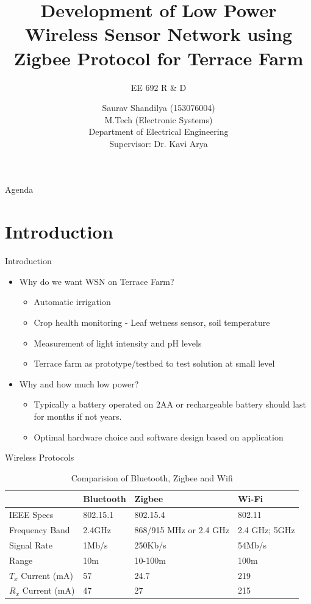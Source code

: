 \documentclass[t]{beamer} %
\title{Development of Low Power Wireless Sensor Network using Zigbee Protocol for Terrace Farm}
\subtitle
{	EE 692 R \& D
}
\author
{	
	Saurav Shandilya (153076004) \\
	M.Tech (Electronic Systems)\\
	Department of Electrical Engineering \\
	Supervisor: Dr. Kavi Arya
}
\date{} %
\begin{document}
\maketitle
\begin{frame}{Agenda}
\tableofcontents
\end{frame}

\section{Introduction}
\begin{frame}{Introduction}
\begin{itemize}
\item \large{Why do we want WSN on Terrace Farm? }
	\begin{itemize}
	\item Automatic irrigation
    \item Crop health monitoring - Leaf wetness sensor, soil temperature
    \item Measurement of light intensity and pH levels
    \item Terrace farm as prototype/testbed to test solution at small level \\[0.5cm]
	\end{itemize}	
\item \large{Why and how much low power?}
	\begin{itemize}
	\item Typically a battery operated on 2AA or rechargeable battery should last for months if not years.
    \item Optimal hardware choice and software design based on application
	\end{itemize}
	
\end{itemize}
\end{frame}

\begin{frame}{Wireless Protocols}
\begin{table}[!h]
	\caption{Comparision of Bluetooth, Zigbee and Wifi }
	\label{Effect of data sampling frequency on Disaggregration}
	\centering
	\begin{tabular}{|L|L|L|L|}
		\hline
		& Bluetooth & Zigbee & Wi-Fi \\
        \hline
        IEEE Specs & 802.15.1 & 802.15.4 & 802.11 \\
        \hline
        Frequency Band & 2.4GHz & 868/915 MHz or 2.4 GHz  & 2.4 GHz; 5GHz\\        
        \hline
        Signal Rate & 1Mb/s & 250Kb/s & 54Mb/s \\
        \hline
        Range & 10m & 10-100m & 100m \\
        \hline
        $T_x$ Current (mA) & 57 & 24.7 & 219 \\
        \hline
        $R_x$ Current (mA) & 47 & 27 & 215 \\
        \hline
	\end{tabular}
\end{table}

\end{frame}
\end{document}
